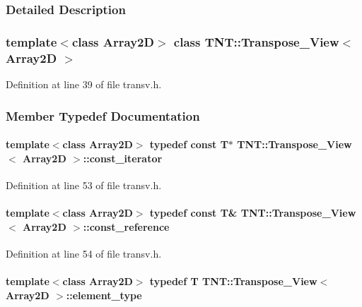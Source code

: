 \subsubsection{Detailed Description}
\subsubsection*{template$<$class Array2D$>$ class TNT::Transpose\_\-View$<$ Array2D $>$}



Definition at line 39 of file transv.h.



\subsubsection{Member Typedef Documentation}
\paragraph[{const\_\-iterator}]{\setlength{\rightskip}{0pt plus 5cm}template$<$class Array2D$>$ typedef const {\bf T}$\ast$ {\bf TNT::Transpose\_\-View}$<$ Array2D $>$::{\bf const\_\-iterator}}\hfill\label{class_t_n_t_1_1_transpose___view_a4eee446cd2b0c526ea7ec2da820dd012}


Definition at line 53 of file transv.h.

\paragraph[{const\_\-reference}]{\setlength{\rightskip}{0pt plus 5cm}template$<$class Array2D$>$ typedef const {\bf T}\& {\bf TNT::Transpose\_\-View}$<$ Array2D $>$::{\bf const\_\-reference}}\hfill\label{class_t_n_t_1_1_transpose___view_adef63f90c184dfd85d499febacfb368f}


Definition at line 54 of file transv.h.

\paragraph[{element\_\-type}]{\setlength{\rightskip}{0pt plus 5cm}template$<$class Array2D$>$ typedef {\bf T} {\bf TNT::Transpose\_\-View}$<$ Array2D $>$::{\bf element\_\-type}}\hfill\label{class_t_n_t_1_1_transpose___view_a4b6a3486e7c7637f1d4af06218b0e767}



